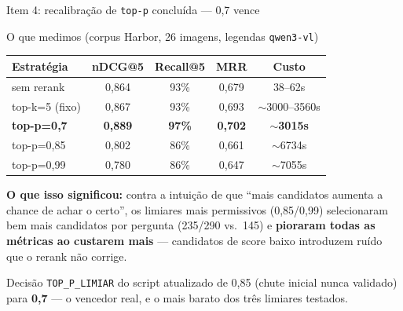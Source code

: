 \documentclass{beamer}
\newenvironment{numerobloco}[1]{\begin{block}{#1}}{\end{block}}
\newenvironment{decisaobloco}[1]{\begin{alertblock}{#1}}{\end{alertblock}}
\begin{document}
\begin{frame}{Item 4: recalibração de \texttt{top-p} concluída — 0,7 vence}
  \small
  \begin{numerobloco}{O que medimos (corpus Harbor, 26 imagens, legendas \texttt{qwen3-vl})}
    \begin{center}
    \footnotesize
    \begin{tabular}{lcccc}
      \toprule
      \textbf{Estratégia} & \textbf{nDCG@5} & \textbf{Recall@5} & \textbf{MRR} & \textbf{Custo} \\
      \midrule
      sem rerank         & 0,864          & 93\%          & 0,679          & 38--62s \\
      top-k=5 (fixo)     & 0,867          & 93\%          & 0,693          & $\sim$3000--3560s \\
      \textbf{top-p=0,7} & \textbf{0,889} & \textbf{97\%} & \textbf{0,702} & \textbf{$\sim$3015s} \\
      top-p=0,85         & 0,802          & 86\%          & 0,661          & $\sim$6734s \\
      top-p=0,99         & 0,780          & 86\%          & 0,647          & $\sim$7055s \\
      \bottomrule
    \end{tabular}
    \end{center}
  \end{numerobloco}

  \pause
  \textbf{O que isso significou:} contra a intuição de que ``mais candidatos aumenta a
  chance de achar o certo'', os limiares mais permissivos (0,85/0,99) selecionaram bem
  mais candidatos por pergunta (235/290 vs.\ 145) e \textbf{pioraram todas as métricas ao
  custarem mais} — candidatos de score baixo introduzem ruído que o rerank não corrige.

  \pause
  \begin{decisaobloco}{Decisão}
    \texttt{TOP\_P\_LIMIAR} do script atualizado de 0,85 (chute inicial nunca validado)
    para \textbf{0,7} — o vencedor real, e o mais barato dos três limiares testados.
  \end{decisaobloco}
\end{frame}
\end{document}
